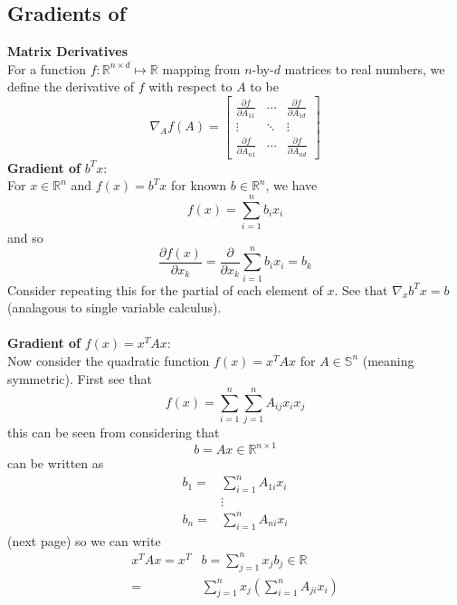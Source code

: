 \documentclass{report}
\begin{document}
\subsection{Gradients of }
\textbf{Matrix Derivatives}\\
For a function $f:\mathbb{R}^{n\times d}\mapsto\mathbb{R}$ mapping from $n$-by-$d$ matrices to real numbers,
we define the derivative of $f$ with respect to $A$ to be
\begin{equation*}
\nabla_Af(A)=\begin{bmatrix}
\frac{\partial f}{\partial A_{11}}&\cdots&\frac{\partial f}{\partial A_{1d}}\\
\vdots&\ddots&\vdots\\
\frac{\partial f}{\partial A_{n1}}&\cdots&\frac{\partial f}{\partial A_{nd}}
\end{bmatrix}
\end{equation*}
\textbf{Gradient of} $b^Tx$:\\
For $x\in\mathbb{R}^n$ and $f(x)=b^Tx$ for known $b\in\mathbb{R}^n$, we have
\begin{equation*}
f(x)=\sum^n_{i=1}b_ix_i
\end{equation*}
and so
\begin{equation*}
\frac{\partial f(x)}{\partial x_k}=\frac{\partial}{\partial x_k}\sum^n_{i=1}b_ix_i=b_k
\end{equation*}
Consider repeating this for the partial of each element of $x$. See that $\nabla_xb^Tx=b$ (analagous to
single variable calculus).\\
\vspace{1mm}\\
\textbf{Gradient of} $f(x)=x^TAx$:\\
Now consider the quadratic function $f(x)=x^TAx$ for $A\in\mathbb{S}^n$ (meaning symmetric). First see that
\begin{equation*}
f(x)=\sum^n_{i=1}\sum^n_{j=1}A_{ij}x_ix_j
\end{equation*}
this can be seen from considering that 
\begin{equation*}
b=Ax\in\mathbb{R}^{n\times1}
\end{equation*}
can be written as
\begin{align*}
b_1=&\sum^n_{i=1}A_{1i}x_i\\
&\vdots\\
b_n=&\sum^n_{i=1}A_{ni}x_i
\end{align*}
(next page)
\newpage
\noindent so we can write
\begin{align*}
x^TAx=x^T&b=\sum^n_{j=1}x_jb_j\in\mathbb{R}\\
=&\sum^n_{j=1}x_j\left(\sum^n_{i=1}A_{ji}x_i\right)
\end{align*}
\end{document}
